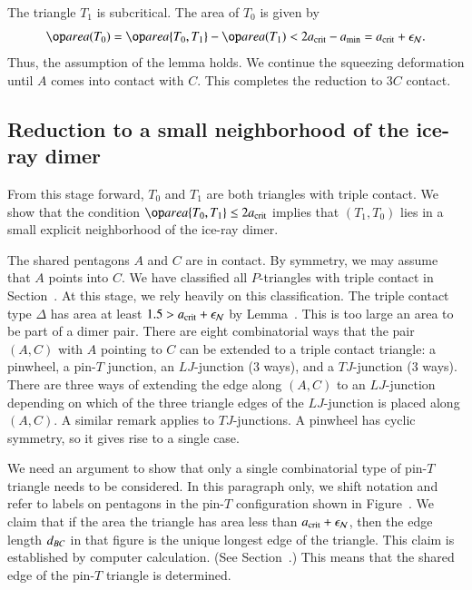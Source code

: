 The triangle $T_1$ is subcritical.  The area of $T_0$ is given by
\[
\area(T_0) = \area\{T_0,T_1\} - \area(T_1) 
< 2\acrit - \ao = \acrit+\epsN.
\]
Thus, the assumption of the lemma holds.  We continue the squeezing
deformation until $A$ comes into contact with $C$.  This completes the
reduction to $3C$ contact.


\subsection{Reduction to a small neighborhood of the ice-ray
  dimer}

From this stage forward, $T_0$ and $T_1$ are both triangles with
triple contact.  We show that the condition $\area\{T_0,T_1\}\le
2\acrit$ implies that $(T_1,T_0)$ lies in a small explicit
neighborhood of the ice-ray dimer.

The shared pentagons $A$ and $C$ are in contact.  By symmetry, we may
assume that $A$ points into $C$.  We have classified all $P$-triangles
with triple contact in Section~.  At this stage, we
rely heavily on this classification.  The triple contact type $\Delta$
has area at least $1.5 > a_\text{crit}+\epsilon_{\mathcal N}$ by Lemma~.
This is too large an area to be part of a dimer pair.  There are eight
combinatorial ways that the pair $(A,C)$ with $A$ pointing to $C$ can
be extended to a triple contact triangle: a pinwheel, a pin-$T$
junction, an $LJ$-junction (3 ways), and a $TJ$-junction (3 ways).
There are three ways of extending the edge along $(A,C)$ to an
$LJ$-junction depending on which of the three triangle edges of the
$LJ$-junction is placed along $(A,C)$.  A similar remark applies to
$TJ$-junctions.  A pinwheel has cyclic symmetry, so it gives rise to a
single case.

We need an argument to show that only a single combinatorial type of
pin-$T$ triangle needs to be considered.  In this paragraph only, we
shift notation and refer to labels on pentagons in the pin-$T$
configuration shown in Figure~.  We claim that if
the area the triangle has area less than $a_\text{crit}+\epsilon_{\mathcal N}$, then the edge
length $d_{BC}$ in that figure is the unique longest edge of the
triangle.  This claim is established by computer calculation.  (See
Section~.)  This means that the shared edge of the
pin-$T$ triangle is determined.

